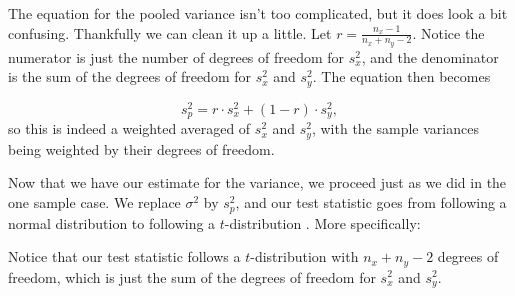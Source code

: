 \begin{table}[h]
\begin{center}
\end{center}
\end{table}

The equation for the pooled variance isn't too complicated, but it does look a bit confusing.  Thankfully we can clean it up a little.  Let $r = \frac{n_x - 1}{n_x + n_y - 2}$.  Notice the numerator is just the number of degrees of freedom for $s^2_x$, and the denominator is the sum of the degrees of freedom for $s^2_x$ and $s^2_y$.  The equation then becomes

\begin{equation*}
s^2_p = r\cdot s^2_x + (1-r)\cdot s^2_y,
\end{equation*}
so this is indeed a weighted averaged of $s^2_x$ and $s^2_y$, with the sample variances being weighted by their degrees of freedom.

Now that we have our estimate for the variance, we proceed just as we did in the one sample case.  We replace $\sigma^2$ by $s^2_p$, and our test statistic goes from following a normal distribution to following a $t$-distribution  .  More specifically:

\begin{table}[h]
\begin{center}
\end{center}
\end{table}
Notice that our test statistic follows a $t$-distribution with $n_x + n_y -2$ degrees of freedom, which is just the sum of the degrees of freedom for $s^2_x$ and $s^2_y$.

